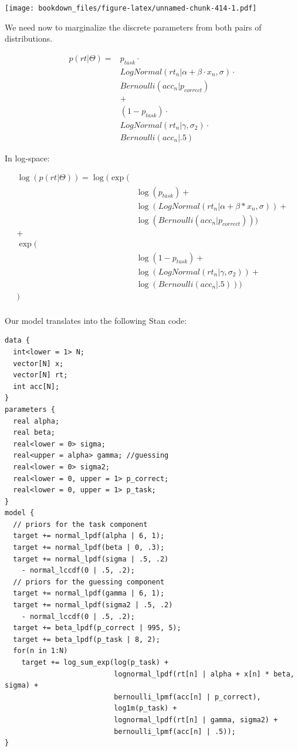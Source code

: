 \documentclass[12pt,]{krantz}
\theoremstyle{definition}
\theoremstyle{definition}
\theoremstyle{definition}
\theoremstyle{remark}
\begin{document}
\texttt{[image: bookdown\_files/figure-latex/unnamed-chunk-414-1.pdf]}

We need now to marginalize the discrete parameters from both pairs of
distributions.

\begin{equation}
\begin{aligned}
p(rt | \Theta) = & p_{task} \cdot \\
& LogNormal(rt_n | \alpha + \beta \cdot x_n, \sigma) \cdot \\
& Bernoulli(acc_n | p_{correct}) \\
& +\\ 
& (1 - p_{task}) \cdot \\
& LogNormal(rt_n | \gamma, \sigma_2) \cdot\\
& Bernoulli(acc_n | .5)
\end{aligned}
\end{equation}

In log-space:

\begin{equation}
\begin{aligned}
\log(p(rt | \Theta)) =  \log(\exp(&\\
& \log(p_{task}) +\\
  &\log(LogNormal(rt_n | \alpha + \beta * x_n, \sigma)) + \\
  &\log(Bernoulli(acc_n | p_{correct})))\\
  +&\\ 
 \exp(&\\
 & \log(1 - p_{task}) + \\
 & \log(LogNormal(rt_n |\gamma, \sigma_2)) + \\
 & \log(Bernoulli(acc_n | .5)))\\
    )& \\
\end{aligned}
\end{equation}

Our model translates into the following Stan code:

\begin{verbatim}
data {
  int<lower = 1> N;
  vector[N] x;
  vector[N] rt;
  int acc[N];
}
parameters {
  real alpha;
  real beta;
  real<lower = 0> sigma;
  real<upper = alpha> gamma; //guessing
  real<lower = 0> sigma2;
  real<lower = 0, upper = 1> p_correct;
  real<lower = 0, upper = 1> p_task;
}
model {
  // priors for the task component
  target += normal_lpdf(alpha | 6, 1);
  target += normal_lpdf(beta | 0, .3);
  target += normal_lpdf(sigma | .5, .2)
    - normal_lccdf(0 | .5, .2);
  // priors for the guessing component
  target += normal_lpdf(gamma | 6, 1);
  target += normal_lpdf(sigma2 | .5, .2)
    - normal_lccdf(0 | .5, .2);
  target += beta_lpdf(p_correct | 995, 5);
  target += beta_lpdf(p_task | 8, 2);
  for(n in 1:N)
    target += log_sum_exp(log(p_task) +
                          lognormal_lpdf(rt[n] | alpha + x[n] * beta, sigma) +
                          bernoulli_lpmf(acc[n] | p_correct),
                          log1m(p_task) +
                          lognormal_lpdf(rt[n] | gamma, sigma2) +
                          bernoulli_lpmf(acc[n] | .5));
}
\end{verbatim}
\end{document}
